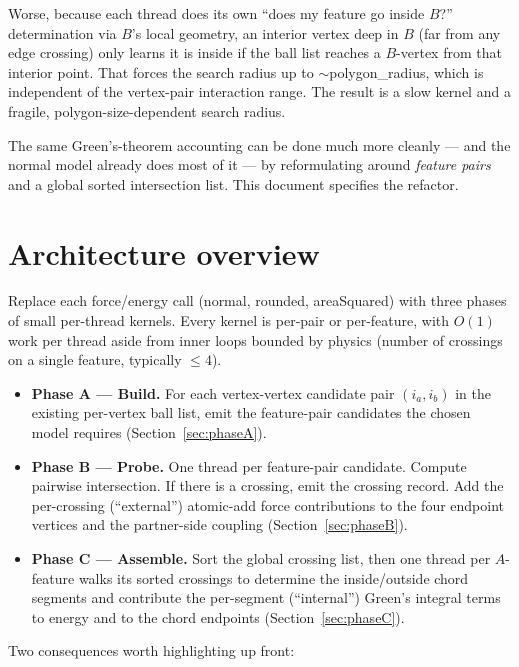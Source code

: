 \documentclass[11pt]{article}
\begin{document}
Worse, because each thread does its own ``does my feature go inside
$B$?'' determination via $B$'s local geometry, an interior vertex deep
in $B$ (far from any edge crossing) only learns it is inside if the ball
list reaches a $B$-vertex from that interior point. That forces the
search radius up to $\sim$polygon\_radius, which is independent of the
vertex-pair interaction range. The result is a slow kernel and a
fragile, polygon-size-dependent search radius.

The same Green's-theorem accounting can be done much more cleanly --- and
the normal model already does most of it --- by reformulating around
\emph{feature pairs} and a global sorted intersection list. This document
specifies the refactor.

\section{Architecture overview}

Replace each force/energy call (normal, rounded, areaSquared) with three
phases of small per-thread kernels. Every kernel is per-pair or
per-feature, with $O(1)$ work per thread aside from inner loops bounded
by physics (number of crossings on a single feature, typically $\le 4$).

\begin{itemize}[leftmargin=*]
  \item \textbf{Phase A --- Build.} For each vertex-vertex candidate
        pair $(i_a, i_b)$ in the existing per-vertex ball list, emit the
        feature-pair candidates the chosen model requires
        (Section~\ref{sec:phaseA}).
  \item \textbf{Phase B --- Probe.} One thread per feature-pair
        candidate. Compute pairwise intersection. If there is a crossing,
        emit the crossing record. Add the per-crossing
        (``external'') atomic-add force contributions to the four
        endpoint vertices and the partner-side coupling
        (Section~\ref{sec:phaseB}).
  \item \textbf{Phase C --- Assemble.} Sort the global crossing list,
        then one thread per $A$-feature walks its sorted crossings to
        determine the inside/outside chord segments and contribute the
        per-segment (``internal'') Green's integral terms to energy and
        to the chord endpoints (Section~\ref{sec:phaseC}).
\end{itemize}

Two consequences worth highlighting up front:
\end{document}
